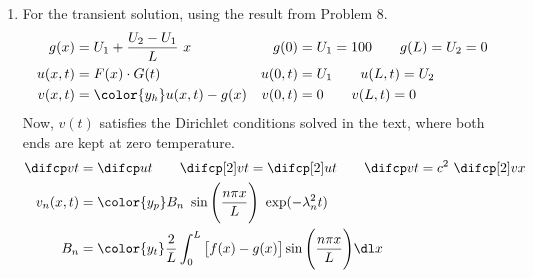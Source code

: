 \begin{enumerate}
    \item For the transient solution, using the result from Problem $ 8 $.
          \begin{align}
              g(x)    & = U_1 + \frac{U_2 - U_1}{L}\ x    &
              g(0)    & = U_1 = 100 \qquad g(L) = U_2 = 0   \\
              u(x, t) & = F(x) \cdot G(t)                 &
              u(0, t) & = U_1 \qquad u(L, t) = U_2          \\
              v(x, t) & = \color{y_h} u(x, t) - g(x)      &
              v(0, t) & = 0 \qquad v(L, t) = 0
          \end{align}
          Now, $ v(t) $ satisfies the Dirichlet conditions solved in the text, where
          both ends are kept at zero temperature.
          \begin{align}
              \difcp vt & = \difcp ut \qquad
              \difcp[2] vt = \difcp[2] ut \qquad
              \difcp vt = c^2\ \difcp[2] vx                                     \\
              v_n(x, t) & = \color{y_p} B_n\ \sin\Bigg( \frac{n\pi x}{L} \Bigg)
              \ \exp(-\lambda_n^2 t)                                            \\
              B_n       & = \color{y_t} \frac{2}{L} \int_{0}^{L}
              \big[f(x) - g(x)\big] \sin\Bigg(\frac{n\pi x}{L} \Bigg) \dl x
          \end{align}


\end{enumerate}
